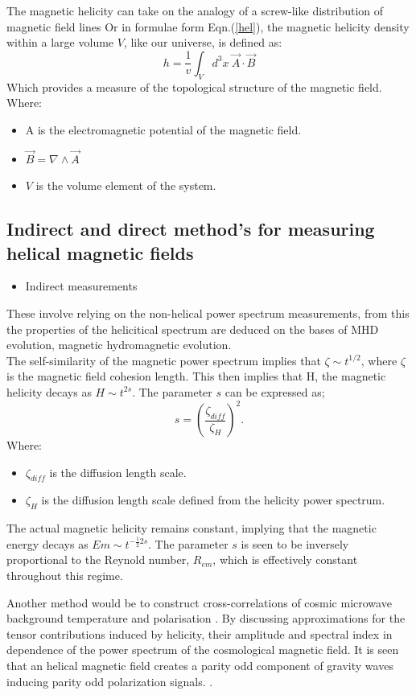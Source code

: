 The magnetic helicity can take on the analogy of a screw-like distribution of magnetic field lines \cite{4} Or in formulae form Eqn.(\ref{hel}), the magnetic helicity density within a large volume $V$, like our universe, is defined as:
\begin{equation} \label{hel}
h = \frac{1}{v} \int_{V} d^{3}x ~\vec{A} \cdot \vec{B}
\end{equation}
Which provides a measure of the topological structure of the magnetic field.\cite{4}
Where:
\begin{itemize}
\item A is the electromagnetic potential of the magnetic field.
\item $\vec{B} = \nabla \wedge \vec{A}$
\item $V$ is the volume element of the system.
\end{itemize}
\subsection {Indirect and direct method's for measuring helical magnetic fields}
\begin{itemize}
\item {Indirect measurements}
\end{itemize}
These involve relying on the non-helical power spectrum measurements, from this the properties of the helicitical spectrum are deduced on the bases of MHD evolution, magnetic hydromagnetic evolution.\cite{7}\\
The self-similarity of the magnetic power spectrum implies that $\zeta \sim t^{1/2}$, where $\zeta$ is the magnetic field cohesion length. This then implies that H, the magnetic helicity decays as $H \sim t^{2s}$. 
The parameter $s$ can be expressed as\cite{7}\cite{6};
\begin{equation}
s = (\frac{\zeta_{diff}}{\zeta_{H}})^{2}.
\end{equation}
Where:
\begin{itemize}
\item $\zeta_{diff}$ is the diffusion length scale.
\item $\zeta_{H}$ is the diffusion length scale defined from the helicity power spectrum.
\end{itemize}
The actual magnetic helicity remains constant, implying that the magnetic energy decays as $Em \sim t^{-\frac{1}{2}2s}$. The parameter $s$ is seen to be inversely proportional to the Reynold number, $R_{em}$, which is effectively constant throughout this regime. \cite{7}
\par Another method would be to construct cross-correlations of cosmic microwave background temperature and polarisation \cite{18}.
By discussing approximations for the tensor contributions induced by helicity, their amplitude and spectral index in dependence of the power spectrum of the cosmological magnetic field. It is seen that an helical magnetic field creates a parity odd component of gravity waves inducing parity odd polarization signals. \cite{7}\cite{4}.

